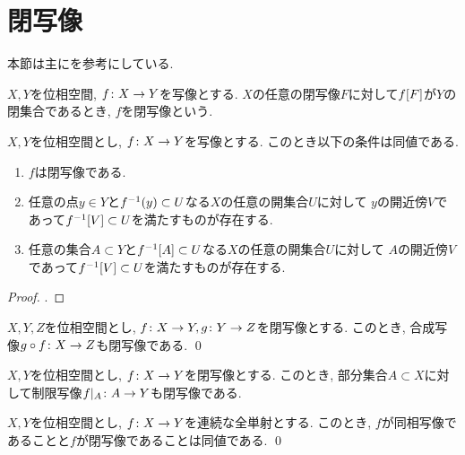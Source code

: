 \documentclass[uplatex, dvipdfmx, a4paper, 12pt, class=jsbook, crop=false]{standalone}
\begin{document}
\section{閉写像}
\label{sec:closed-maps}

\begin{source}
	本節は主に\cite{Engelking1989GT}を参考にしている.
\end{source}

\begin{definition}
	$ X, Y $を位相空間, $ f\colon X\to Y $を写像とする.
	$ X $の任意の閉写像$ F $に対して$ \mapset{f}{F} $が$ Y $の閉集合であるとき,
    $ f $を閉写像という.
\end{definition}

\begin{proposition}
    \label{c00001}
    $ X, Y $を位相空間とし, $ f\colon X\to Y $を写像とする.
    このとき以下の条件は同値である.
    \begin{enumerate}
        \item $ f $は閉写像である.
        \item 任意の点$ y \in Y $と$ \mapinvpt{f}{y} \subset U $なる$ X $の任意の開集合$ U $に対して
        $ y $の開近傍$ V $であって$ \mapinvset{f}{V} \subset U $を満たすものが存在する.
        \item 任意の集合$ A \subset Y $と$ \mapinvset{f}{A} \subset U $なる$ X $の任意の開集合$ U $に対して
        $ A $の開近傍$ V $であって$ \mapinvset{f}{V} \subset U $を満たすものが存在する.
    \end{enumerate}
\end{proposition}

\begin{proof}
    \WIP.
\end{proof}

\begin{proposition}
    $ X, Y, Z $を位相空間とし, $ f\colon X\to Y, g\colon Y\to Z $を閉写像とする.
    このとき, 合成写像$ g \circ f\colon X\to Z $も閉写像である.
    \qed
\end{proposition}

\begin{proposition}
    $ X, Y $を位相空間とし, $ f\colon X\to Y $を閉写像とする.
    このとき, 部分集合$ A \subset X $に対して制限写像$ f|_A\colon A\to Y $も閉写像である.
\end{proposition}

\begin{proposition}
    $ X, Y $を位相空間とし, $ f\colon X\to Y $を連続な全単射とする.
    このとき, $ f $が同相写像であることと$ f $が閉写像であることは同値である.
    \qed
\end{proposition}
\end{document}

